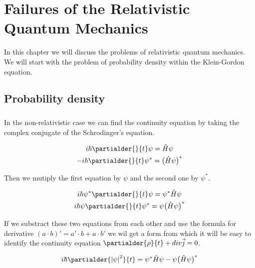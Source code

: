 \chapter{Failures of the Relativistic Quantum Mechanics}

In this chapter we will discuss the problems of relativistic quantum mechanics. We will start
with the problem of probability density within the Klein-Gordon equation.

\section{Probability density}

\paragraph{} In the non-relativistic case we can find the continuity equation by taking the complex conjugate
of the Schrodinger's equation.

\begin{equation*}
    \begin{gathered}
        i \hbar \partialder{}{t} \psi = \hat{H} \psi \\
        - i \hbar \partialder{}{t} \psi^{*} = \big(\hat{H} \psi \big)^{*}
    \end{gathered}
\end{equation*}

Then we mutiply the first equation by $\psi$ and the second one by $\psi^{*}$.

\begin{equation*}
    \begin{gathered}
        i \hbar \psi^{*} \partialder{}{t} \psi = \psi^{*} \hat{H} \psi \\
        i \hbar \psi \partialder{}{t} \psi^{*} = \psi \big(\hat{H} \psi \big)^{*}
    \end{gathered}
\end{equation*}

If we substract these two equations from each other and use the formula for derivative $(a \cdot b)' = a' \cdot b + a \cdot b'$
we wil get a form from which it will be easy to identify the continuity equation $\partialder{\rho}{t} + div \vec{j} = 0$.

\begin{equation*}
    i \hbar \partialder{\left|\psi\right|^{2}}{t}  = \psi^{*} \hat{H} \psi - \psi \big(\hat{H} \psi \big)^{*}
\end{equation*}

